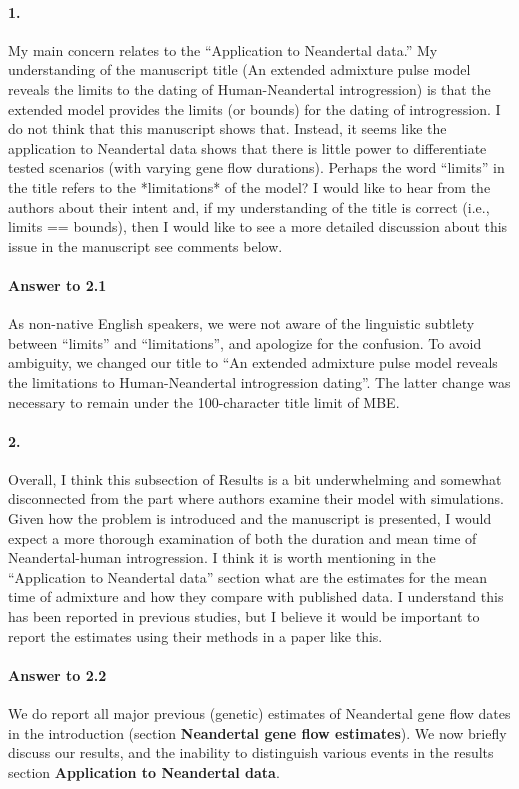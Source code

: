 \documentclass[11pt]{article}
\let\oldparagraph\paragraph
\renewcommand{\paragraph}[1]{\oldparagraph{#1}\mbox{}}
\begin{document}
\paragraph{1.}
My main concern relates to the “Application to Neandertal data.” My understanding of the manuscript title (An extended admixture pulse model reveals the limits to the dating of Human-Neandertal introgression) is that the extended model provides the limits (or bounds) for the dating of introgression. I do not think that this manuscript shows that. Instead, it seems like the application to Neandertal data shows that there is little power to differentiate tested scenarios (with varying gene flow durations). Perhaps the word “limits” in the title refers to the *limitations* of the model? I would like to hear from the authors about their intent and, if my understanding of the title is correct (i.e., limits == bounds), then I would like to see a more detailed discussion about this issue in the manuscript see comments below.

\paragraph{Answer to 2.1}
As non-native English speakers, we were not aware of the linguistic subtlety between ``limits'' and  ``limitations'', and apologize for the confusion. To avoid ambiguity, we changed our title to ``An extended admixture pulse model reveals the limitations to Human-Neandertal introgression dating''. The latter change was necessary to remain under the 100-character title limit of MBE.

\paragraph{2.}
Overall, I think this subsection of Results is a bit underwhelming and somewhat disconnected from the part where authors examine their model with simulations. Given how the problem is introduced and the manuscript is presented, I would expect a more thorough examination of both the duration and mean time of Neandertal-human introgression. I think it is worth mentioning in the “Application to Neandertal data” section what are the estimates for the mean time of admixture and how they compare with published data. I understand this has been reported in previous studies, but I believe it would be important to report the estimates using their methods in a paper like this.

\paragraph{Answer to 2.2}
We do report all major previous (genetic) estimates of Neandertal gene flow dates in the introduction (section \textbf{Neandertal gene flow estimates}). We now briefly discuss our results, and the inability to distinguish various events in the results section \textbf{Application to Neandertal data}.
\end{document}

